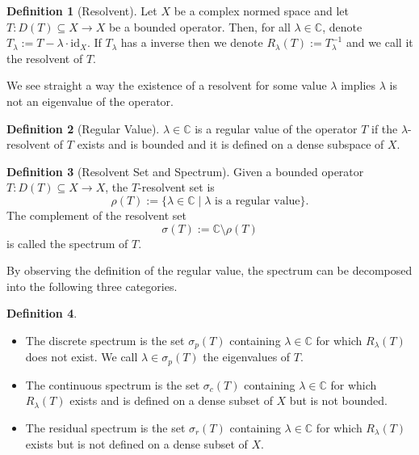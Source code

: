 \documentclass[]{article}
\theoremstyle{definition}
\theoremstyle{definition}
\newtheorem{definition}{Definition}[section]
\begin{document}
\begin{definition}[Resolvent]
  Let \(X\) be a complex normed space and let \(T : D(T) \subseteq X \to X\) 
  be a bounded operator. Then, for all \(\lambda \in \mathbb{C}\), denote 
  \(T_\lambda := T - \lambda \cdot \text{id}_X\). If \(T_\lambda\) has 
  a inverse then we denote \(R_\lambda(T) := T_\lambda^{-1}\) and we call 
  it the resolvent of \(T\).
\end{definition}

We see straight a way the existence of a resolvent for some value \(\lambda\) 
implies \(\lambda\) is not an eigenvalue of the operator.

\begin{definition}[Regular Value]
  \(\lambda \in \mathbb{C}\) is a regular value of the operator \(T\) if 
  the \(\lambda\)-resolvent of \(T\) exists and is bounded and it is defined 
  on a dense subspace of \(X\).
\end{definition}

\begin{definition}[Resolvent Set and Spectrum]
  Given a bounded operator \(T : D(T) \subseteq X \to X\), the \(T\)-resolvent 
  set is 
  \[\rho(T) := \{\lambda \in \mathbb{C} \mid \lambda \text{ is a regular value}\}.\]
  The complement of the resolvent set 
  \[\sigma(T) := \mathbb{C} \setminus \rho(T)\]
  is called the spectrum of \(T\). 
\end{definition}

By observing the definition of the regular value, the spectrum can be decomposed 
into the following three categories.

\begin{definition}\ 
  \begin{itemize}
    \item The discrete spectrum is the set \(\sigma_p(T)\) containing 
      \(\lambda \in \mathbb{C}\) for which \(R_\lambda(T)\) does not exist.
      We call \(\lambda \in \sigma_p(T)\) the eigenvalues of \(T\).
    \item The continuous spectrum is the set \(\sigma_c(T)\) containing 
      \(\lambda \in \mathbb{C}\) for which \(R_\lambda(T)\) exists and is 
      defined on a dense subset of \(X\) but is not bounded.
    \item The residual spectrum is the set \(\sigma_r(T)\) containing 
      \(\lambda \in \mathbb{C}\) for which \(R_\lambda(T)\) exists but is not 
      defined on a dense subset of \(X\).
  \end{itemize}
\end{definition}
\end{document}
